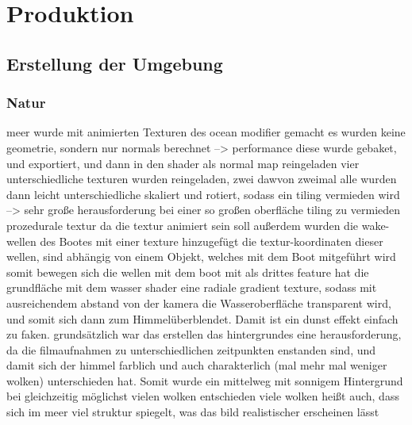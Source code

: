 \chapter{Produktion}

\section{Erstellung der Umgebung}

\subsection{Natur}

meer wurde mit animierten Texturen des ocean modifier gemacht
es wurden keine geometrie, sondern nur normals berechnet --> performance
diese wurde gebaket, und exportiert, und dann in den shader als normal map reingeladen
vier unterschiedliche texturen wurden reingeladen, zwei dawvon zweimal
alle wurden dann leicht unterschiedliche skaliert und rotiert, sodass ein tiling vermieden wird
--> sehr große herausforderung bei einer so großen oberfläche tiling zu vermieden
prozedurale textur da die textur animiert sein soll
außerdem wurden die wake-wellen des Bootes mit einer texture hinzugefügt
die textur-koordinaten dieser wellen, sind abhängig von einem Objekt, welches mit dem Boot mitgeführt wird
somit bewegen sich die wellen mit dem boot mit
als drittes feature hat die grundfläche mit dem wasser shader eine radiale gradient texture, sodass mit ausreichendem abstand von der kamera die Wasseroberfläche transparent wird, und somit sich dann zum Himmelüberblendet. Damit ist ein dunst effekt einfach zu faken.
grundsätzlich war das erstellen das hintergrundes eine herausforderung, da die filmaufnahmen zu unterschiedlichen zeitpunkten enstanden sind, und damit sich der himmel farblich und auch charakterlich (mal mehr mal weniger wolken) unterschieden hat. Somit wurde ein mittelweg mit sonnigem Hintergrund bei gleichzeitig möglichst vielen wolken entschieden
viele wolken heißt auch, dass sich im meer viel struktur spiegelt, was das bild realistischer erscheinen lässt

